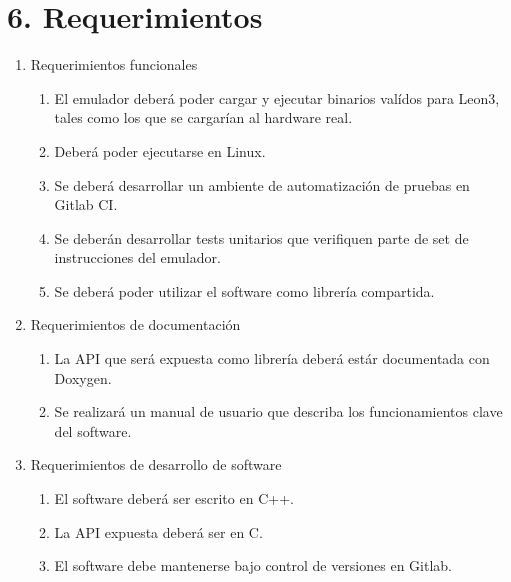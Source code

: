\section{6. Requerimientos}
\label{sec:6-requerimientos}

\begin{enumerate}
\item Requerimientos funcionales
	\begin{enumerate}
  \item El emulador deberá poder cargar y ejecutar binarios valídos para Leon3, tales como los que se cargarían al hardware real.
	\item Deberá poder ejecutarse en Linux.
  \item Se deberá desarrollar un ambiente de automatización de pruebas en Gitlab CI.
  \item Se deberán desarrollar tests unitarios que verifiquen parte de set de instrucciones del emulador.
  \item Se deberá poder utilizar el software como librería compartida.
	\end{enumerate}

\item Requerimientos de documentación
	\begin{enumerate}
	\item La API que será expuesta como librería deberá estár documentada con Doxygen.
	\item Se realizará un manual de usuario que describa los funcionamientos clave del software.
	\end{enumerate}

\item Requerimientos de desarrollo de software
  \begin{enumerate}
  \item El software deberá ser escrito en C++.
  \item La API expuesta deberá ser en C.
  \item El software debe mantenerse bajo control de versiones en Gitlab.
  \end{enumerate}
\end{enumerate}

